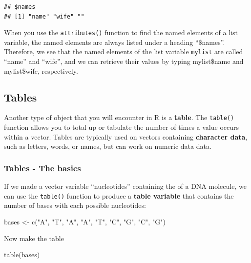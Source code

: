 \documentclass[
]{book}
\newenvironment{Shaded}{\begin{snugshade}}{\end{snugshade}}
\newcommand{\FunctionTok}[1]{\textcolor[rgb]{0.00,0.00,0.00}{#1}}
\newcommand{\NormalTok}[1]{#1}
\newcommand{\OtherTok}[1]{\textcolor[rgb]{0.56,0.35,0.01}{#1}}
\newcommand{\StringTok}[1]{\textcolor[rgb]{0.31,0.60,0.02}{#1}}
\begin{document}
\begin{verbatim}
## $names
## [1] "name" "wife" ""
\end{verbatim}

When you use the \texttt{attributes()} function to find the named elements of a list variable, the named elements are always listed under a heading ``\$names''. Therefore, we see that the named elements of the list variable \texttt{mylist} are called ``name'' and ``wife'', and we can retrieve their values by typing mylist\$name and mylist\$wife, respectively.

\hypertarget{tables}{%
\subsection{Tables}\label{tables}}

Another type of object that you will encounter in R is a \textbf{table}. The \texttt{table()} function allows you to total up or tabulate the number of times a value occurs within a vector. Tables are typically used on vectors containing \textbf{character data}, such as letters, words, or names, but can work on numeric data data.

\hypertarget{tables---the-basics}{%
\subsubsection{Tables - The basics}\label{tables---the-basics}}

If we made a vector variable ``nucleotides'' containing the of a DNA molecule, we can use the \texttt{table()} function to produce a \textbf{table variable} that contains the number of bases with each possible nucleotides:

\begin{Shaded}
\begin{Highlighting}[]
\NormalTok{bases }\OtherTok{\textless{}{-}} \FunctionTok{c}\NormalTok{(}\StringTok{"A"}\NormalTok{, }\StringTok{"T"}\NormalTok{, }\StringTok{"A"}\NormalTok{, }\StringTok{"A"}\NormalTok{, }\StringTok{"T"}\NormalTok{, }\StringTok{"C"}\NormalTok{, }\StringTok{"G"}\NormalTok{, }\StringTok{"C"}\NormalTok{, }\StringTok{"G"}\NormalTok{)}
\end{Highlighting}
\end{Shaded}

Now make the table

\begin{Shaded}
\begin{Highlighting}[]
\FunctionTok{table}\NormalTok{(bases)}
\end{Highlighting}
\end{Shaded}
\end{document}
